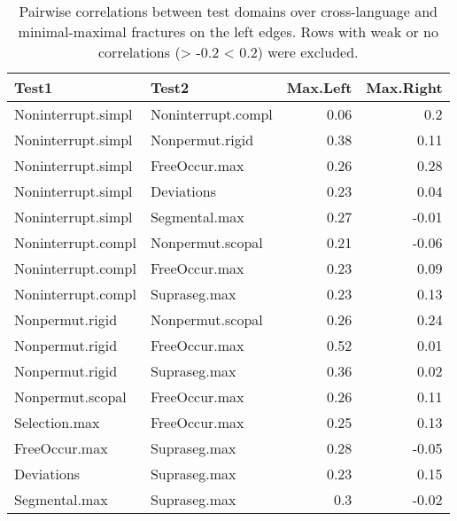 \begin{table}
\centering
\caption{\label{tab:tab:corrtablemax}Pairwise correlations between test domains over cross-language and minimal-maximal fractures on the left edges. Rows with weak or no correlations (> -0.2 < 0.2) were excluded.}
\centering
\begin{tabular}[t]{llrr}
\toprule
Test1 & Test2 & Max.Left & Max.Right\\
\midrule
Noninterrupt.simpl & Noninterrupt.compl & 0.06 & \cellcolor{red!25}0.2\\
Noninterrupt.simpl & Nonpermut.rigid & \cellcolor{red!45}0.38 & 0.11\\
Noninterrupt.simpl & FreeOccur.max & \cellcolor{red!25}0.26 & \cellcolor{red!25}0.28\\
Noninterrupt.simpl & Deviations & \cellcolor{red!25}0.23 & 0.04\\
Noninterrupt.simpl & Segmental.max & \cellcolor{red!25}0.27 & -0.01\\
Noninterrupt.compl & Nonpermut.scopal & \cellcolor{red!25}0.21 & -0.06\\
Noninterrupt.compl & FreeOccur.max & \cellcolor{red!25}0.23 & 0.09\\
Noninterrupt.compl & Supraseg.max & \cellcolor{red!25}0.23 & 0.13\\
Nonpermut.rigid & Nonpermut.scopal & \cellcolor{red!25}0.26 & \cellcolor{red!25}0.24\\
Nonpermut.rigid & FreeOccur.max & \cellcolor{red!45}0.52 & 0.01\\
Nonpermut.rigid & Supraseg.max & \cellcolor{red!45}0.36 & 0.02\\
Nonpermut.scopal & FreeOccur.max & \cellcolor{red!25}0.26 & 0.11\\
Selection.max & FreeOccur.max & \cellcolor{red!25}0.25 & 0.13\\
FreeOccur.max & Supraseg.max & \cellcolor{red!25}0.28 & -0.05\\
Deviations & Supraseg.max & \cellcolor{red!25}0.23 & 0.15\\
Segmental.max & Supraseg.max & \cellcolor{red!25}0.3 & -0.02\\
\bottomrule
\end{tabular}
\end{table}
